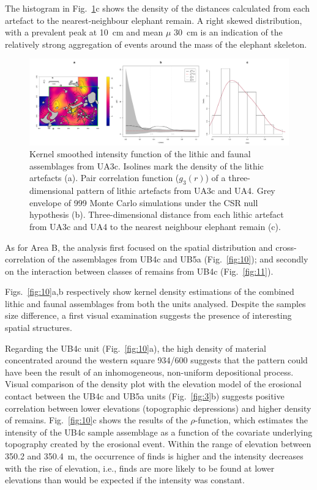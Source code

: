 \documentclass[review,authoryear,times]{elsarticle} %
\begin{document}
The histogram in Fig.~\ref{fig:9}c shows the density of the distances calculated from each artefact to the nearest-neighbour elephant remain. A right skewed distribution, with a prevalent peak at 10~cm and mean $\mu$ 30~cm is an indication of the relatively strong aggregation of events around the mass of the elephant skeleton.

\begin{figure}[]
  \centering
  \includegraphics[width=1\textwidth]{../artwork/Fig9.pdf}
  \caption{Kernel smoothed intensity function of the lithic and faunal assemblages from UA3c. Isolines mark the density of the lithic artefacts (a). Pair correlation function ($g_3(r)$) of a three-dimensional pattern of lithic artefacts from UA3c and UA4. Grey envelope of 999 Monte Carlo simulations under the CSR null hypothesis (b). Three-dimensional distance from each lithic artefact from UA3c and UA4 to the nearest neighbour elephant remain (c).}
  \label{fig:9}
\end{figure}


As for Area B, the analysis first focused on the spatial distribution and cross-correlation of the assemblages from UB4c and UB5a (Fig.~\ref{fig:10}); and secondly on the interaction between classes of remains from UB4c (Fig.~\ref{fig:11}).

Figs.~\ref{fig:10}a,b respectively show kernel density estimations of the combined lithic and faunal assemblages from both the units analysed. Despite the samples size difference, a first visual examination suggests the presence of interesting spatial structures.

Regarding the UB4c unit (Fig.~\ref{fig:10}a), the high density of material concentrated around the western square 934/600 suggests that the pattern could have been the result of an inhomogeneous, non-uniform depositional process. Visual comparison of the density plot with the elevation model of the erosional contact between the UB4c and UB5a units (Fig.~\ref{fig:3}b) suggests positive correlation between lower elevations (topographic depressions) and higher density of remains. Fig.~\ref{fig:10}c shows the results of the $\rho$-function, which estimates the intensity of the UB4c sample assemblage as a function of the covariate underlying topography created by the erosional event. Within the range of elevation between 350.2 and 350.4~m, the occurrence of finds is higher and the intensity decreases with the rise of elevation, i.e., finds are more likely to be found at lower elevations than would be expected if the intensity was constant.
\end{document}
